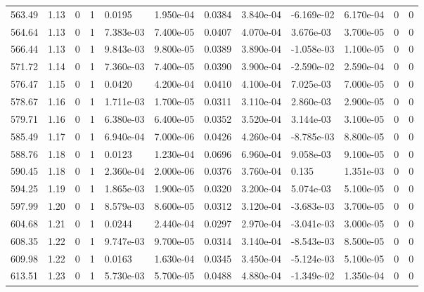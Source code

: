 \documentclass[preview]{standalone}
\begin{document}
{{{{{{{{{{{{{{{{\begin{tabular}{L{1.2cm}C{1.2cm} C{0.3cm}C{0.5cm} C{1.4cm}C{1.4cm} C{1.4cm}C{1.4cm} C{1.6cm}C{1.6cm} C{1.6cm}C{1.6cm}}
  563.49  &  1.13  & 0     &  1 &  0.0195  & 1.950e-04  &  0.0384&   3.840e-04& -6.169e-02 & 6.170e-04   &  0 & 0  \\ 
  564.64  &  1.13  & 0     &  1 &  7.383e-03  & 7.400e-05  &  0.0407&   4.070e-04& 3.676e-03 & 3.700e-05   &  0 & 0  \\ 
  566.44  &  1.13  & 0     &  1 &  9.843e-03  & 9.800e-05  &  0.0389&   3.890e-04& -1.058e-03 & 1.100e-05   &  0 & 0  \\ 
  571.72  &  1.14  & 0     &  1 &  7.360e-03  & 7.400e-05  &  0.0390&   3.900e-04& -2.590e-02 & 2.590e-04   &  0 & 0  \\ 
  576.47  &  1.15  & 0     &  1 &  0.0420  & 4.200e-04  &  0.0410&   4.100e-04& 7.025e-03 & 7.000e-05   &  0 & 0  \\ 
  578.67  &  1.16  & 0     &  1 &  1.711e-03  & 1.700e-05  &  0.0311&   3.110e-04& 2.860e-03 & 2.900e-05   &  0 & 0  \\ 
  579.71  &  1.16  & 0     &  1 &  6.380e-03  & 6.400e-05  &  0.0352&   3.520e-04& 3.144e-03 & 3.100e-05   &  0 & 0  \\ 
  585.49  &  1.17  & 0     &  1 &  6.940e-04  & 7.000e-06  &  0.0426&   4.260e-04& -8.785e-03 & 8.800e-05   &  0 & 0  \\ 
  588.76  &  1.18  & 0     &  1 &  0.0123  & 1.230e-04  &  0.0696&   6.960e-04& 9.058e-03 & 9.100e-05   &  0 & 0  \\ 
  590.45  &  1.18  & 0     &  1 &  2.360e-04  & 2.000e-06  &  0.0376&   3.760e-04& 0.135 & 1.351e-03   &  0 & 0  \\ 
  594.25  &  1.19  & 0     &  1 &  1.865e-03  & 1.900e-05  &  0.0320&   3.200e-04& 5.074e-03 & 5.100e-05   &  0 & 0  \\ 
  597.99  &  1.20  & 0     &  1 &  8.579e-03  & 8.600e-05  &  0.0312&   3.120e-04& -3.683e-03 & 3.700e-05   &  0 & 0  \\ 
  604.68  &  1.21  & 0     &  1 &  0.0244  & 2.440e-04  &  0.0297&   2.970e-04& -3.041e-03 & 3.000e-05   &  0 & 0  \\ 
  608.35  &  1.22  & 0     &  1 &  9.747e-03  & 9.700e-05  &  0.0314&   3.140e-04& -8.543e-03 & 8.500e-05   &  0 & 0  \\ 
  609.98  &  1.22  & 0     &  1 &  0.0163  & 1.630e-04  &  0.0345&   3.450e-04& -5.124e-03 & 5.100e-05   &  0 & 0  \\ 
  613.51  &  1.23  & 0     &  1 &  5.730e-03  & 5.700e-05  &  0.0488&   4.880e-04& -1.349e-02 & 1.350e-04   &  0 & 0  \\ 
\hline 
\end{tabular} 

}}}}}}}}}}}}}}}}
\end{document}
